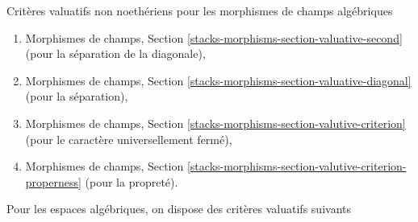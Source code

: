 \medskip\noindent
Critères valuatifs non noethériens pour les morphismes de champs algébriques
\begin{enumerate}
\item Morphismes de champs, Section
\ref{stacks-morphisms-section-valuative-second}
(pour la séparation de la diagonale),
\item Morphismes de champs, Section
\ref{stacks-morphisms-section-valuative-diagonal}
(pour la séparation),
\item Morphismes de champs, Section
\ref{stacks-morphisms-section-valutive-criterion}
(pour le caractère universellement fermé),
\item Morphismes de champs, Section
\ref{stacks-morphisms-section-valutive-criterion-properness}
(pour la propreté).
\end{enumerate}
Pour les espaces algébriques, on dispose des critères valuatifs suivants
